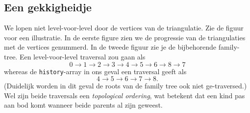 \documentclass[11pt,a4paper]{amsart}
\theoremstyle{definition}
\begin{document}
\subsection*{Een gekkigheidje}
We lopen niet level-voor-level door de vertices van de triangulatie. Zie de figuur
voor een illustratie. In de eerste figure zien we de progressie van de triangulaties
met de vertices genummerd. In de tweede figuur zie je de bijbehorende family-tree.
Een level-voor-level traversal zou gaan als
\[
  0 \to 1 \to 2 \to 3 \to 4 \to 5 \to 6 \to 8 \to 7
\]
whereas de \texttt{history}-array in ons geval een traversal geeft als
\[
  4 \to 5 \to 6 \to 7 \to 8.
\]
(Duidelijk worden in dit geval de roots van de family tree ook niet ge-traversed.)
Wel zijn beide traversals een \emph{topological ordering}, wat betekent dat een
kind pas aan bod komt wanneer beide parents al zijn geweest.
\end{document}
